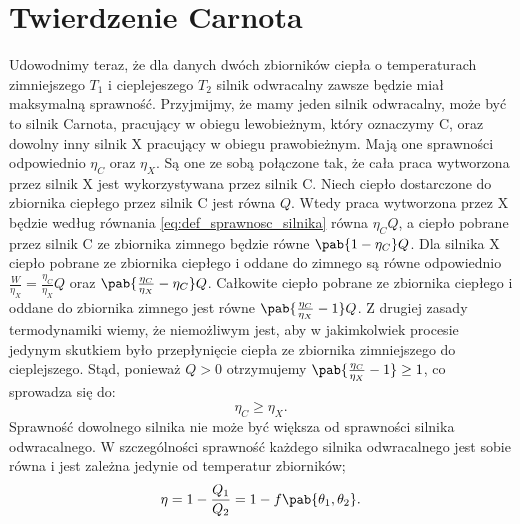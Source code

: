 \section{Twierdzenie Carnota}
Udowodnimy teraz, że dla danych dwóch zbiorników ciepła o temperaturach zimniejszego $T_1$ i cieplejeszego $T_2$ silnik odwracalny zawsze będzie miał maksymalną sprawność. Przyjmijmy, że mamy jeden silnik odwracalny, może być to silnik Carnota, pracujący w obiegu lewobieżnym, który oznaczymy C, oraz dowolny inny silnik X pracujący w obiegu prawobieżnym. Mają one sprawności odpowiednio $\eta_C$ oraz $\eta_X$. Są one ze sobą połączone tak, że cała praca wytworzona przez silnik X jest wykorzystywana przez silnik C. Niech ciepło dostarczone do zbiornika ciepłego przez silnik C jest równa $Q$. Wtedy praca wytworzona przez X będzie według równania \eqref{eq:def_sprawnosc_silnika} równa $\eta_C Q$, a ciepło pobrane przez silnik C ze zbiornika zimnego będzie równe $\pab{1 - \eta_C}Q$. Dla silnika X ciepło pobrane ze zbiornika ciepłego i oddane do zimnego są równe odpowiednio $\frac{W}{\eta_X} = \frac{\eta_C}{\eta_X}Q$ oraz $\pab{\frac{\eta_C}{\eta_X} - \eta_C}Q$. Całkowite ciepło pobrane ze zbiornika ciepłego i oddane do zbiornika zimnego jest równe $\pab{\frac{\eta_C}{\eta_X} - 1}Q$. Z drugiej zasady termodynamiki wiemy, że niemożliwym jest, aby w jakimkolwiek procesie jedynym skutkiem było przepłynięcie ciepła ze zbiornika zimniejszego do cieplejszego. Stąd, ponieważ $Q > 0$ otrzymujemy $\pab{\frac{\eta_C}{\eta_X} - 1} \geq 1$, co sprowadza się do:
\begin{equation}\label{eq:tw_carnot}
\eta_C \geq \eta_X.
\end{equation}
Sprawność dowolnego silnika nie może być większa od sprawności silnika odwracalnego. W szczególności sprawność każdego silnika odwracalnego jest sobie równa i jest zależna jedynie od temperatur zbiorników;
\begin{equation}
\eta = 1 - \frac{Q_1}{Q_2} = 1 - f\pab{\theta_1, \theta_2}.
\end{equation}

